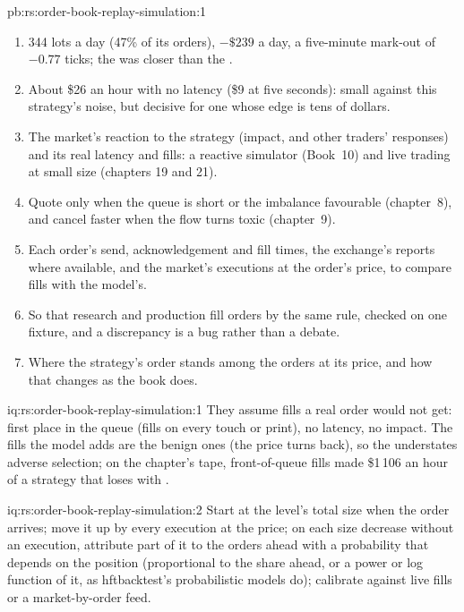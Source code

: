 \begin{solution}{pb:rs:order-book-replay-simulation:1}
\begin{enumerate}
\item 344 lots a day (47\% of its orders), $-\$239$ a day, a five-minute mark-out of $-0.77$ ticks; the  was closer than the .
\item About \$26 an hour with no latency (\$9 at five seconds): small against this strategy's noise, but decisive for one whose edge is tens of dollars.
\item The market's reaction to the strategy (impact, and other traders' responses) and its real latency and fills: a reactive simulator (Book~10) and live trading at
small size (chapters 19 and 21).
\item Quote only when the queue is short or the imbalance favourable (chapter~8), and cancel faster when the flow turns toxic (chapter~9).
\item Each order's send, acknowledgement and fill times, the exchange's  reports where available, and the market's executions at the order's price, to
compare fills with the model's.
\item So that research and production fill orders by the same rule, checked on one fixture, and a discrepancy is a bug rather than a debate.
\item Where the strategy's order stands among the orders at its price, and how that changes as the book does.
\end{enumerate}
\end{solution}

\begin{solution}{iq:rs:order-book-replay-simulation:1}
They assume fills a real order would not get: first place in the queue (fills on every touch or print), no latency, no impact. The fills the model adds are the
benign ones (the price turns back), so the  understates adverse selection; on the chapter's tape, front-of-queue fills made \$1\,106 an hour of a strategy
that loses with .
\end{solution}

\begin{solution}{iq:rs:order-book-replay-simulation:2}
Start at the level's total size when the order arrives; move it up by every execution at the price; on each size decrease without an execution, attribute part of it
to the orders ahead with a probability that depends on the position (proportional to the share ahead, or a power or log function of it, as hftbacktest's
probabilistic models do); calibrate against live fills or a market-by-order feed.
\end{solution}

